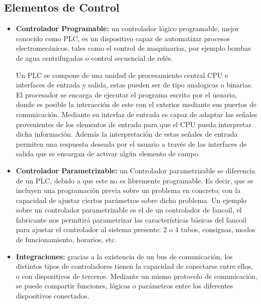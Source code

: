 \subsection{Elementos de Control}
\begin{itemize}
\item \textbf{Controlador Programable:}
un controlador lógico programable, mejor conocido como PLC, es un dispositivo capaz de automatizar procesos electromecánicos, tales como el control de maquinarias, por ejemplo bombas de agua centrifugadas o control secuencial de relés. 

Un PLC se compone de una unidad de procesamiento central CPU e interfaces de entrada y salida, estas pueden ser de tipo analogicas o binarias. El procesador se encarga de ejecutar el programa escrito por el usuario, donde es posible la interacción de este con el exterior mediante sus puertos de comunicación. Mediante su interfaz de entrada es capaz de adaptar las señales provenientes de los elementos de entrada para que el CPU pueda interpretar dicha información. Además la interpretación de estas señales de entrada permiten una respuesta deseada por el usuario a través de las interfaces de salida que se encargan de activar algún elemento de campo. 

\item \textbf{Controlador Parametrizable:}
un Controlador parametrizable se diferencia de un PLC, debido a que este no es libremente programable. Es decir, que se incluyen una programación previa sobre un problema en concreto; con la capacidad de ajustar ciertos parámetros sobre dicho problema. Un ejemplo sobre un controlador parametrizable es el de un controlador de
fancoil, el fabricante nos permitirá parametrizar las características básicas del fancoil para ajustar el controlador al sistema presente: 2 o 4 tubos, consignas, modos de funcionamiento, horarios, etc.

\item \textbf{Integraciones:}
gracias a la existencia de un bus de comunicación, los distintos tipos de controladores tienen la capacidad de conectarse entre ellos, o con dispositivos de terceros. Mediante un mismo protocolo de comunicación, se puede compartir funciones, lógicas o parámetros entre los diferentes dispositivos conectados.

\end{itemize}

